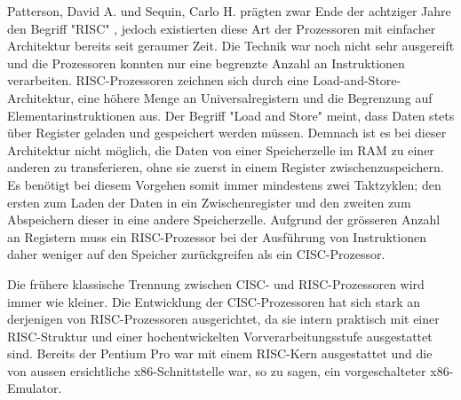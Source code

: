 \par
Patterson, David A. und Sequin, Carlo H. prägten zwar Ende der achtziger Jahre den Begriff "RISC" \cite{Patterson:1981:RIR:800052.801895}, jedoch existierten diese Art der Prozessoren mit einfacher Architektur bereits seit geraumer Zeit. Die Technik war noch nicht sehr ausgereift und die Prozessoren konnten nur eine begrenzte Anzahl an Instruktionen verarbeiten. RISC-Prozessoren zeichnen sich durch eine Load-and-Store-Architektur, eine höhere Menge an Universalregistern und die Begrenzung auf Elementarinstruktionen aus. Der Begriff "Load and Store" meint, dass Daten stets über Register geladen und gespeichert werden müssen. Demnach ist es bei dieser Architektur nicht möglich, die Daten von einer Speicherzelle im RAM zu einer anderen zu transferieren, ohne sie zuerst in einem Register zwischenzuspeichern. Es benötigt bei diesem Vorgehen somit immer mindestens zwei Taktzyklen; den ersten zum Laden der Daten in ein Zwischenregister und den zweiten zum Abspeichern dieser in eine andere Speicherzelle. Aufgrund der grösseren Anzahl an Registern muss ein RISC-Prozessor bei der Ausführung von Instruktionen daher weniger auf den Speicher zurückgreifen als ein CISC-Prozessor.
\par
Die frühere klassische Trennung zwischen CISC- und RISC-Prozessoren wird immer wie kleiner. Die Entwicklung der CISC-Prozessoren hat sich stark an derjenigen von RISC-Prozessoren ausgerichtet, da sie intern praktisch mit einer RISC-Struktur und einer hochentwickelten Vorverarbeitungsstufe ausgestattet sind. Bereits der Pentium Pro war mit einem RISC-Kern ausgestattet und die von aussen ersichtliche x86-Schnittstelle war, so zu sagen, ein vorgeschalteter x86-Emulator.




